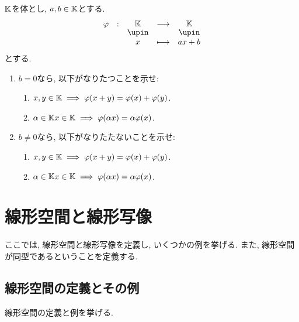 \begin{quiz}
  $\mathbb{K}$を体とし, $a, b\in \mathbb{K}$とする.
  \begin{align*}
    \shazo{\varphi}{\KK}{\KK}{x}{ax+b}
  \end{align*}
  とする.
  \begin{enumerate}
  \item
  $b=0$なら, 以下がなりたつことを示せ:
  \begin{enumerate}
    \item $x,y\in \mathbb{K}\implies \varphi(x+y)=\varphi(x)+\varphi(y)$.
    \item $\alpha\in\mathbb{K} x\in \mathbb{K}\implies \varphi(\alpha x)=\alpha\varphi(x)$.
  \end{enumerate}
  \item
  $b\neq 0$なら, 以下がなりたたないことを示せ:
  \begin{enumerate}
    \item $x,y\in \mathbb{K}\implies \varphi(x+y)=\varphi(x)+\varphi(y)$.
    \item $\alpha\in\mathbb{K} x\in \mathbb{K}\implies \varphi(\alpha x)=\alpha\varphi(x)$.
  \end{enumerate}
  \end{enumerate}
\end{quiz}


\chapter{線形空間と線形写像}
ここでは, 線形空間と線形写像を定義し,
いくつかの例を挙げる.
また, 線形空間が同型であるということを定義する.

\section{線形空間の定義とその例}
線形空間の定義と例を挙げる.

